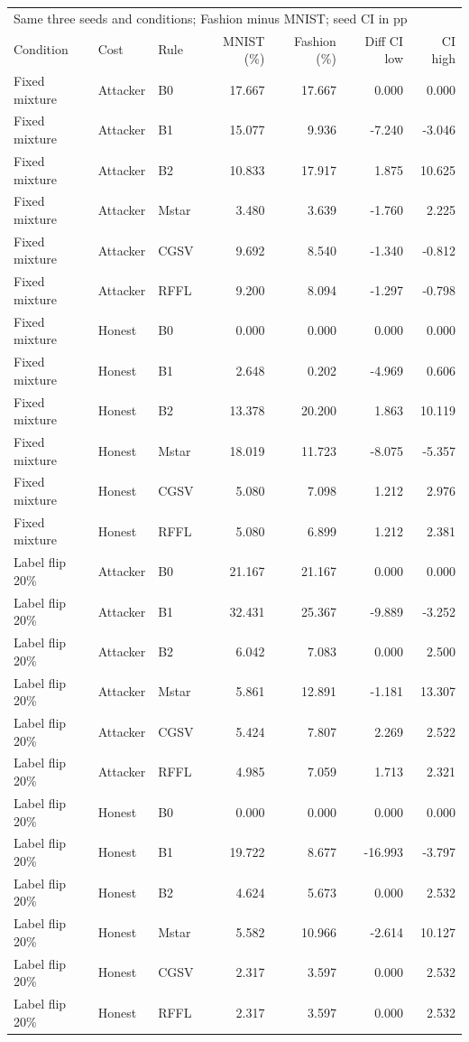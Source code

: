 \begin{tabular}{lllrrrr}
\toprule
\multicolumn{7}{l}{Same three seeds and conditions; Fashion minus MNIST; seed CI in pp} \\
Condition & Cost & Rule & MNIST (\%) & Fashion (\%) & Diff CI low & CI high \\
\midrule
Fixed mixture & Attacker & B0 & 17.667 & 17.667 & 0.000 & 0.000 \\
Fixed mixture & Attacker & B1 & 15.077 & 9.936 & -7.240 & -3.046 \\
Fixed mixture & Attacker & B2 & 10.833 & 17.917 & 1.875 & 10.625 \\
Fixed mixture & Attacker & Mstar & 3.480 & 3.639 & -1.760 & 2.225 \\
Fixed mixture & Attacker & CGSV & 9.692 & 8.540 & -1.340 & -0.812 \\
Fixed mixture & Attacker & RFFL & 9.200 & 8.094 & -1.297 & -0.798 \\
Fixed mixture & Honest & B0 & 0.000 & 0.000 & 0.000 & 0.000 \\
Fixed mixture & Honest & B1 & 2.648 & 0.202 & -4.969 & 0.606 \\
Fixed mixture & Honest & B2 & 13.378 & 20.200 & 1.863 & 10.119 \\
Fixed mixture & Honest & Mstar & 18.019 & 11.723 & -8.075 & -5.357 \\
Fixed mixture & Honest & CGSV & 5.080 & 7.098 & 1.212 & 2.976 \\
Fixed mixture & Honest & RFFL & 5.080 & 6.899 & 1.212 & 2.381 \\
Label flip 20\% & Attacker & B0 & 21.167 & 21.167 & 0.000 & 0.000 \\
Label flip 20\% & Attacker & B1 & 32.431 & 25.367 & -9.889 & -3.252 \\
Label flip 20\% & Attacker & B2 & 6.042 & 7.083 & 0.000 & 2.500 \\
Label flip 20\% & Attacker & Mstar & 5.861 & 12.891 & -1.181 & 13.307 \\
Label flip 20\% & Attacker & CGSV & 5.424 & 7.807 & 2.269 & 2.522 \\
Label flip 20\% & Attacker & RFFL & 4.985 & 7.059 & 1.713 & 2.321 \\
Label flip 20\% & Honest & B0 & 0.000 & 0.000 & 0.000 & 0.000 \\
Label flip 20\% & Honest & B1 & 19.722 & 8.677 & -16.993 & -3.797 \\
Label flip 20\% & Honest & B2 & 4.624 & 5.673 & 0.000 & 2.532 \\
Label flip 20\% & Honest & Mstar & 5.582 & 10.966 & -2.614 & 10.127 \\
Label flip 20\% & Honest & CGSV & 2.317 & 3.597 & 0.000 & 2.532 \\
Label flip 20\% & Honest & RFFL & 2.317 & 3.597 & 0.000 & 2.532 \\
\bottomrule
\end{tabular}
